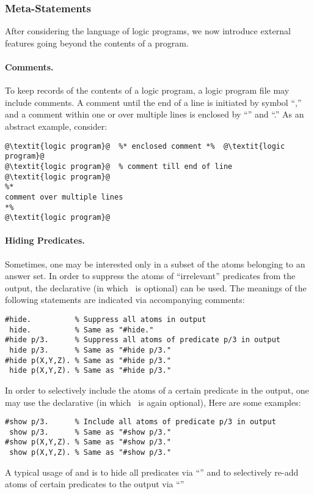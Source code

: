 \subsubsection{Meta-Statements}\label{subsec:gringo:meta}

After considering the language of logic programs,
we now introduce external features going beyond the contents of a program.

\paragraph{Comments.}
To keep records of the contents of a logic program,
a logic program file may include comments.
A comment until the end of a line is initiated by symbol ``\code{\%},''
and a comment within one or over multiple lines is enclosed
by ``\code{\%*}'' and ``\code{*\%}.''
As an abstract example, consider:
%
\begin{lstlisting}[numbers=none,escapechar=@]
@\textit{logic program}@  %* enclosed comment *%  @\textit{logic program}@
@\textit{logic program}@  % comment till end of line
@\textit{logic program}@
%*
comment over multiple lines
*%
@\textit{logic program}@
\end{lstlisting}

\paragraph{Hiding Predicates.}
Sometimes, one may be interested only in a subset of the atoms belonging
to an answer set.
In order to suppress the atoms of ``irrelevant'' predicates from the output,
the  declarative (in which~\code{\#} is optional) can be used.
The meanings of the following statements are indicated via accompanying comments:
%
\begin{lstlisting}[numbers=none]
#hide.          % Suppress all atoms in output
 hide.          % Same as "#hide."
#hide p/3.      % Suppress all atoms of predicate p/3 in output
 hide p/3.      % Same as "#hide p/3."
#hide p(X,Y,Z). % Same as "#hide p/3."
 hide p(X,Y,Z). % Same as "#hide p/3."
\end{lstlisting}
%
In order to selectively include the atoms of a certain predicate in the output,
one may use the  declarative (in which~\code{\#} is again optional),
Here are some examples:
%
\begin{lstlisting}[numbers=none]
#show p/3.      % Include all atoms of predicate p/3 in output
 show p/3.      % Same as "#show p/3."
#show p(X,Y,Z). % Same as "#show p/3."
 show p(X,Y,Z). % Same as "#show p/3."
\end{lstlisting}
%
A typical usage of  and  is to hide all predicates
via ``'' and to selectively re-add atoms of certain predicates
 to the output via ``''


